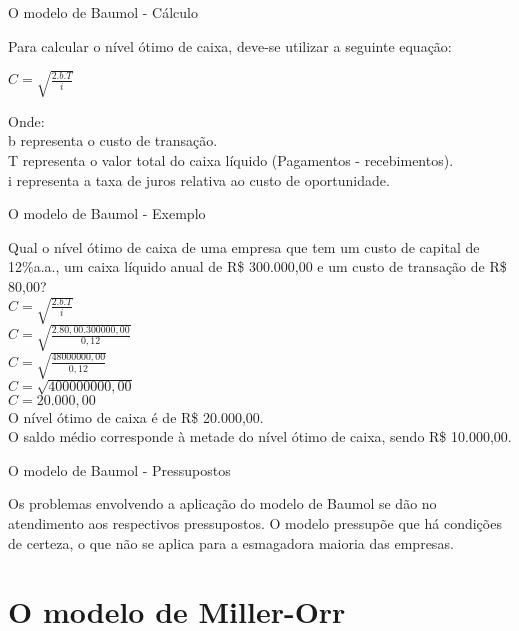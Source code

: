 \documentclass[10pt]{beamer}
\begin{document}
\begin{frame}[fragile]{O modelo de Baumol - Cálculo}

Para calcular o nível ótimo de caixa, deve-se utilizar a seguinte equação:\\
\begin{center}
$ C = \sqrt{\frac{2.b.T}{i}} $
\end{center}
\scriptsize Onde:\\ 
b representa o custo de transação. \\ 
T representa o valor total do caixa líquido (Pagamentos - recebimentos). \\ 
i representa a taxa de juros relativa ao custo de oportunidade.\\
\end{frame}

\begin{frame}[fragile]{O modelo de Baumol - Exemplo}

Qual o nível ótimo de caixa de uma empresa que tem um custo de capital de 12\%a.a., um caixa líquido anual de R\$ 300.000,00 e um custo de transação de R\$ 80,00?  \\

$ C = \sqrt{\frac{2.b.T}{i}} $\\
$ C = \sqrt{\frac{2.80,00.300000,00}{0,12}} $\\
$ C = \sqrt{\frac{48000000,00}{0,12}} $\\
$ C = \sqrt{400000000,00} $\\
$ C = 20.000,00$\\

O nível ótimo de caixa é de R\$ 20.000,00.\\ O saldo médio corresponde à metade do nível ótimo de caixa, sendo R\$ 10.000,00.
\end{frame}

\begin{frame}[fragile]{O modelo de Baumol - Pressupostos}

Os problemas envolvendo a aplicação do modelo de Baumol se dão no atendimento aos respectivos pressupostos. O modelo pressupõe que há condições de certeza, o que não se aplica para a esmagadora maioria das empresas.


\end{frame}






\section{O modelo de Miller-Orr}
\end{document}
